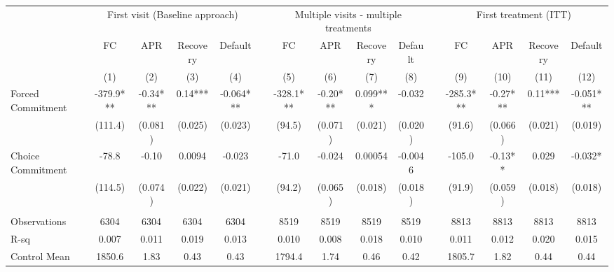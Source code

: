\begin{tabular}{lcccccccccccccc}
\toprule
      & \multicolumn{4}{c}{First visit (Baseline approach)} &       & \multicolumn{4}{c}{Multiple visits - multiple treatments} &       & \multicolumn{4}{c}{First treatment (ITT)} \\
\cmidrule{7-10}\cmidrule{12-15}      & FC    & APR   & Recovery & Default &       & FC    & APR   & Recovery & Default &       & FC    & APR   & Recovery & Default \\
\midrule
      & (1)   & (2)   & (3)   & (4)   &       & (5)   & (6)   & (7)   & (8)   &       & (9)   & (10)  & (11)  & (12) \\
\midrule
\midrule
Forced Commitment & -379.9*** & -0.34*** & 0.14*** & -0.064*** &       & -328.1*** & -0.20*** & 0.099*** & -0.032 &       & -285.3*** & -0.27*** & 0.11*** & -0.051*** \\
      & (111.4) & (0.081) & (0.025) & (0.023) &       & (94.5) & (0.071) & (0.021) & (0.020) &       & (91.6) & (0.066) & (0.021) & (0.019) \\
Choice Commitment & -78.8 & -0.10 & 0.0094 & -0.023 &       & -71.0 & -0.024 & 0.00054 & -0.0046 &       & -105.0 & -0.13** & 0.029 & -0.032* \\
      & (114.5) & (0.074) & (0.022) & (0.021) &       & (94.2) & (0.065) & (0.018) & (0.018) &       & (91.9) & (0.059) & (0.018) & (0.018) \\
      &       &       &       &       &       &       &       &       &       &       &       &       &       &  \\
\midrule
Observations & 6304  & 6304  & 6304  & 6304  &       & 8519  & 8519  & 8519  & 8519  &       & 8813  & 8813  & 8813  & 8813 \\
R-sq  & 0.007 & 0.011 & 0.019 & 0.013 &       & 0.010 & 0.008 & 0.018 & 0.010 &       & 0.011 & 0.012 & 0.020 & 0.015 \\
Control Mean & 1850.6 & 1.83  & 0.43  & 0.43  &       & 1794.4 & 1.74  & 0.46  & 0.42  &       & 1805.7 & 1.82  & 0.44  & 0.44 \\
\bottomrule
\bottomrule
\end{tabular}%
